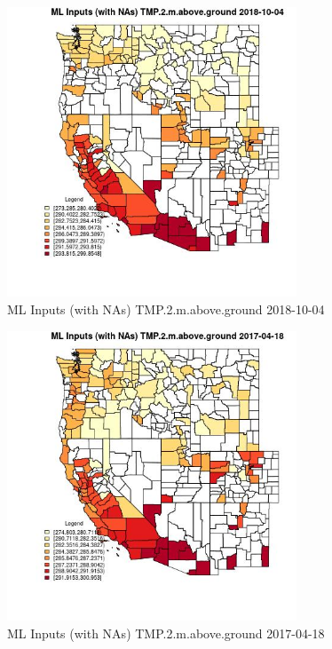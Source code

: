 \begin{figure} 
\centering  
\includegraphics[width=0.77\textwidth]{Code_Outputs/Report_ML_input_PM25_Step4_part_f_de_duplicated_aves_prioritize_24hr_obswNAs_CountyTMP2mabovegroundMean2018-10-04.jpg} 
\caption{\label{fig:Report_ML_input_PM25_Step4_part_f_de_duplicated_aves_prioritize_24hr_obswNAsCountyTMP2mabovegroundMean2018-10-04}ML Inputs (with NAs) TMP.2.m.above.ground 2018-10-04} 
\end{figure} 
 

\begin{figure} 
\centering  
\includegraphics[width=0.77\textwidth]{Code_Outputs/Report_ML_input_PM25_Step4_part_f_de_duplicated_aves_prioritize_24hr_obswNAs_CountyTMP2mabovegroundMean2017-04-18.jpg} 
\caption{\label{fig:Report_ML_input_PM25_Step4_part_f_de_duplicated_aves_prioritize_24hr_obswNAsCountyTMP2mabovegroundMean2017-04-18}ML Inputs (with NAs) TMP.2.m.above.ground 2017-04-18} 
\end{figure} 
 

